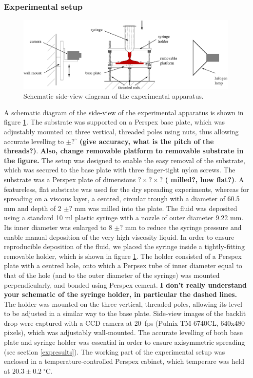\documentclass[aip,graphicx]{revtex4-1}
\newcommand{\degCpm}[2]{#1 \pm #2 \; ^{\circ} \text{C}}
\begin{document}
\subsubsection{Experimental setup}
\label{setup}

\begin{figure}[!h]
\centering
\includegraphics[width=0.99\textwidth]{figures/experimental_apparatus.eps}
\caption{Schematic side-view diagram of the experimental apparatus.}
\label{fig:experimental_apparatus}
\end{figure}

A schematic diagram of the side-view of the experimental apparatus is shown in figure \ref{fig:experimental_apparatus}.
The substrate was supported on a Perspex base plate, which was adjustably mounted on three vertical, threaded poles using nuts, thus allowing accurate levelling to {\bf $\pm ?^\circ$ (give accuracy, what is the pitch of the threads?)}. {\bf Also, change removable platform to removable substrate in the figure.} The setup was designed to enable the easy removal of the substrate, which was secured to the base plate with three finger-tight nylon screws. The substrate was a Perspex plate of dimensions {\bf $? \times ? \times ?$} {\bf( milled?, how flat?)}. A featureless, flat substrate was used for the dry spreading experiments, whereas for spreading on a viscous layer, a centred, circular trough with a diameter of 60.5 mm and depth of 2 {\bf $\pm ?$} mm was milled into the plate. 
The fluid was deposited using a standard 10 ml plastic syringe with a nozzle of outer diameter 9.22 mm. Its inner diameter was enlarged to 8 {\bf $\pm ?$} mm to reduce the syringe pressure and enable manual deposition of the very high viscosity liquid. In order to ensure reproducible deposition of the fluid, we placed the syringe inside a tightly-fitting removable holder, which is shown in figure \ref{fig:experimental_apparatus}. The holder consisted of  a Perspex plate with a centred hole, onto which a Perpsex tube of inner diameter equal to that of the hole (and to the outer diameter of the syringe) was mounted perpendicularly, and bonded using Perspex cement.  {\bf I don't really understand your schematic of the syringe holder, in particular the dashed lines.} The holder was mounted on the three vertical, threaded poles, allowing its level to be adjusted in a similar way to the base plate.  Side-view images of the backlit drop were captured with a CCD camera at 20~fps (Pulnix TM-6740CL,  640x480 pixels), which was adjustably wall-mounted. The accurate levelling  of both base plate and syringe holder was essential in order to ensure axisymmetric spreading (see section \ref{expresults}). The working part of the experimental setup was enclosed in a temperature-controlled Perspex cabinet, which temperare was held at $\degCpm{20.3}{0.2}$.
\end{document}
